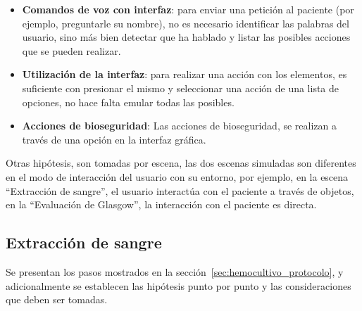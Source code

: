 \begin{itemize}

    \item \textbf{Comandos de voz con interfaz}: para enviar una petición al
        paciente (por ejemplo, preguntarle su nombre), no es necesario
        identificar las palabras del usuario, sino más bien detectar que ha
        hablado y listar las posibles acciones que se pueden realizar.

    \item \textbf{Utilización de la interfaz}: para realizar una acción con los
        elementos, es suficiente con presionar el mismo y seleccionar una acción
        de una lista de opciones, no hace falta emular todas las posibles.

    \item \textbf{Acciones de bioseguridad}: Las acciones de bioseguridad, se
        realizan a través de una opción en la interfaz gráfica.

\end{itemize}


Otras hipótesis, son tomadas por escena, las dos escenas simuladas son
diferentes en el modo de interacción del usuario con su entorno, por ejemplo, en
la escena \enquote{Extracción de sangre}, el usuario interactúa con el paciente
a través de objetos, en la \enquote{Evaluación de Glasgow}, la interacción con
el paciente es directa.

\subsection{Extracción de sangre}
\label{sec:hemocultivo_hipotesis}

Se presentan los pasos mostrados en la sección~\ref{sec:hemocultivo_protocolo},
y adicionalmente se establecen las hipótesis punto por punto y las
consideraciones que deben ser tomadas.



